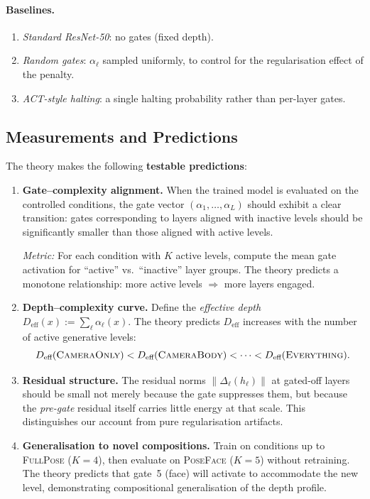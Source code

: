 \documentclass[11pt,a4paper]{article}
\begin{document}
\paragraph{Baselines.}
\begin{enumerate}[nosep]
\item \emph{Standard ResNet-50}: no gates (fixed depth).
\item \emph{Random gates}: $\alpha_\ell$ sampled uniformly,
  to control for the regularisation effect of the penalty.
\item \emph{ACT-style halting}: a single halting probability
  rather than per-layer gates.
\end{enumerate}

\subsection{Measurements and Predictions}\label{sec:predictions}

The theory makes the following \textbf{testable predictions}:

\begin{enumerate}
\item \textbf{Gate--complexity alignment.}\quad
  When the trained model is evaluated on the controlled conditions,
  the gate vector $(\alpha_1,\ldots,\alpha_L)$ should exhibit a
  clear transition: gates corresponding to layers
  aligned with inactive levels should be significantly
  smaller than those aligned with active levels.

  \emph{Metric:} For each condition with $K$ active levels,
  compute the mean gate activation for ``active'' vs.\
  ``inactive'' layer groups.
  The theory predicts a monotone relationship:
  more active levels $\Rightarrow$ more layers engaged.

\item \textbf{Depth--complexity curve.}\quad
  Define the \emph{effective depth}
  $D_{\text{eff}}(x) := \sum_\ell \alpha_\ell(x)$.
  The theory predicts $D_{\text{eff}}$ increases with the
  number of active generative levels:
  \begin{equation}
    D_{\text{eff}}(\textsc{CameraOnly})
    < D_{\text{eff}}(\textsc{CameraBody})
    < \cdots
    < D_{\text{eff}}(\textsc{Everything}).
  \end{equation}

\item \textbf{Residual structure.}\quad
  The residual norms $\|\Delta_\ell(h_\ell)\|$ at
  gated-off layers should be small not merely because the gate
  suppresses them, but because the \emph{pre-gate} residual
  itself carries little energy at that scale.
  This distinguishes our account from pure regularisation artifacts.

\item \textbf{Generalisation to novel compositions.}\quad
  Train on conditions up to \textsc{FullPose} ($K=4$),
  then evaluate on \textsc{PoseFace} ($K=5$) without retraining.
  The theory predicts that gate~5 (face) will
  activate to accommodate the new level,
  demonstrating compositional generalisation of the depth profile.
\end{enumerate}
\end{document}
